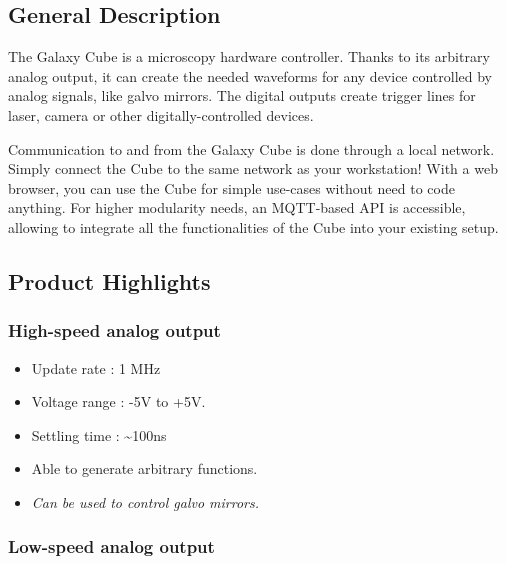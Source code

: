 \documentclass[a4paper]{article}
\providecommand{\tightlist}{\setlength{\itemsep}{0pt}\setlength{\parskip}{0pt}}
\begin{document}
\vspace{1.0cm}

\begin{multicols}{2}
\hypertarget{general-description}{%
\subsection{General Description}\label{general-description}}

The Galaxy Cube is a microscopy hardware controller. Thanks to its
arbitrary analog output, it can create the needed waveforms for any
device controlled by analog signals, like galvo mirrors. The digital
outputs create trigger lines for laser, camera or other
digitally-controlled devices.

Communication to and from the Galaxy Cube is done through a local
network. Simply connect the Cube to the same network as your
workstation! With a web browser, you can use the Cube for simple
use-cases without need to code anything. For higher modularity needs, an
MQTT-based API is accessible, allowing to integrate all the
functionalities of the Cube into your existing setup.

\hypertarget{product-highlights}{%
\subsection{Product Highlights}\label{product-highlights}}

\hypertarget{high-speed-analog-output}{%
\subsubsection{High-speed analog
output}\label{high-speed-analog-output}}

\begin{itemize}
\tightlist
\item
  Update rate : 1 MHz
\item
  Voltage range : -5V to +5V.
\item
  Settling time : \textasciitilde100ns
\item
  Able to generate arbitrary functions.
\item
  \textit{Can be used to control galvo mirrors.}
\end{itemize}

\hypertarget{low-speed-analog-output}{%
\subsubsection{Low-speed analog output}\label{low-speed-analog-output}}


\end{multicols}
\end{document}
